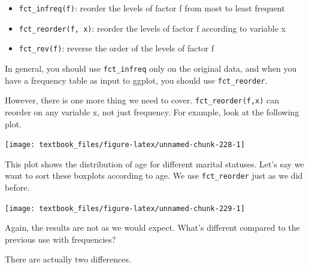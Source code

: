 \documentclass[]{tufte-book}
\newenvironment{Shaded}{}{}
\newcommand{\KeywordTok}[1]{\textcolor[rgb]{0.00,0.44,0.13}{\textbf{#1}}}
\newcommand{\NormalTok}[1]{#1}
\newcommand{\OperatorTok}[1]{\textcolor[rgb]{0.40,0.40,0.40}{#1}}
\newcommand{\StringTok}[1]{\textcolor[rgb]{0.25,0.44,0.63}{#1}}
\providecommand{\tightlist}{%
  \setlength{\itemsep}{0pt}\setlength{\parskip}{0pt}}
\begin{document}
\begin{itemize}
\tightlist
\item
  \texttt{fct\_infreq(f)}: reorder the levels of factor f from most to least frequent
\item
  \texttt{fct\_reorder(f,\ x)}: reorder the levels of factor f according to variable x
\item
  \texttt{fct\_rev(f)}: reverse the order of the levels of factor f
\end{itemize}

In general, you should use \texttt{fct\_infreq} only on the original data, and when you have a frequency table as input to ggplot, you should use \texttt{fct\_reorder}.

However, there is one more thing we need to cover. \texttt{fct\_reorder(f,x)} can reorder on any variable x, not just frequency. For example, look at the following plot.

\begin{Shaded}
\end{Shaded}

\texttt{[image: textbook\_files/figure-latex/unnamed-chunk-228-1]}

This plot shows the distribution of age for different marital statuses. Let's say we want to sort these boxplots according to age. We use \texttt{fct\_reorder} just as we did before.

\begin{Shaded}
\end{Shaded}

\texttt{[image: textbook\_files/figure-latex/unnamed-chunk-229-1]}

Again, the results are not as we would expect. What's different compared to the previous use with frequencies?

There are actually two differences.
\end{document}
